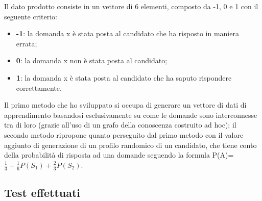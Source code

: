 Il dato prodotto consiste in un vettore di 6 elementi, composto da  -1, 0 e 1 con il seguente criterio:
\begin{itemize}
\item \textbf{-1}: la domanda x \`e stata posta al candidato che ha risposto in maniera errata;
\item \textbf{0}: la domanda x non \`e stata posta al candidato;
\item \textbf{1}: la domanda x \`e stata posta al candidato che ha saputo rispondere correttamente.
\end{itemize}
\noindent
Il primo metodo che ho sviluppato si occupa di generare un vettore di dati di apprendimento basandosi esclusivamente su come le domande sono interconnesse tra di loro (grazie all'uso di un grafo della conoscenza costruito ad hoc); il secondo metodo ripropone quanto perseguito dal primo metodo con il valore aggiunto di generazione di un profilo randomico di un candidato, che tiene conto della  probabilit\`a di risposta ad una domande seguendo la formula P(A)= $\frac{1}{3}+\frac{1}{6}P(S_1)+\frac{2}{3}P(S_2)$.

\subsection{Test effettuati}
\label{Test effettuati}

